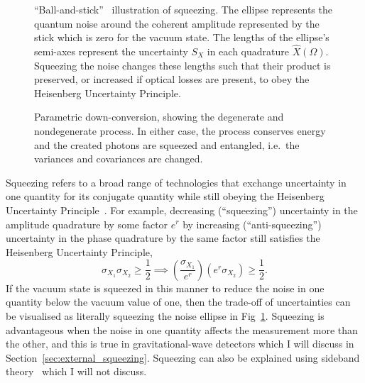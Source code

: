 \begin{figure}
	\centering
	\caption{ ``Ball-and-stick''~\cite{} illustration of squeezing. The ellipse represents the quantum noise around the coherent amplitude represented by the stick which is zero for the vacuum state. The lengths of the ellipse's semi-axes represent the uncertainty $S_X$ in each quadrature $\hat X(\Omega)$. Squeezing the noise changes these lengths such that their product is preserved, or increased if optical losses are present, to obey the Heisenberg Uncertainty Principle.}
	\label{fig:ballandstick_simple}
\end{figure}
\begin{figure}
	\centering
	\caption{Parametric down-conversion, showing the degenerate and nondegenerate process. In either case, the process conserves energy and the created photons are squeezed and entangled, i.e.\ the variances and covariances are changed.}
	\label{fig:PDC_deg_and_nondeg}
\end{figure}

Squeezing refers to a broad range of technologies that exchange uncertainty in one quantity for its conjugate quantity while still obeying the Heisenberg Uncertainty Principle~\cite{}. For example, decreasing (``squeezing'') uncertainty in the amplitude quadrature by some factor $e^r$ by increasing (``anti-squeezing'') uncertainty in the phase quadrature by the same factor still satisfies the Heisenberg Uncertainty Principle, 
\begin{equation}
\sigma_{X_1}\sigma_{X_2}\geq\frac{1}{2}\implies (\frac{\sigma_{X_1}}{e^r}) (e^r\sigma_{X_2})\geq\frac{1}{2}\label{eq:HUP_squeezed}.
\end{equation} 
If the vacuum state is squeezed in this manner to reduce the noise in one quantity below the vacuum value of one, then the trade-off of uncertainties can be visualised as literally squeezing the noise ellipse in Fig~\ref{fig:ballandstick_simple}.
Squeezing is advantageous when the noise in one quantity affects the measurement more than the other, and this is true in gravitational-wave detectors which I will discuss in Section~\ref{sec:external_squeezing}.
Squeezing can also be explained using sideband theory~\cite{} which I will not discuss.

